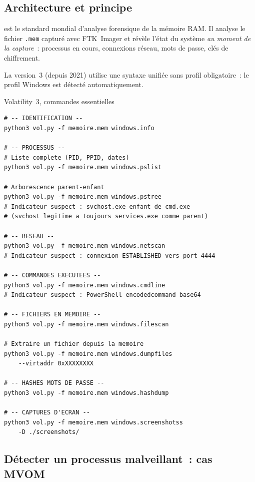\subsection{Architecture et principe}

 est le standard mondial d'analyse
forensique de la mémoire RAM. Il analyse le fichier \texttt{.mem} capturé
avec FTK~Imager et révèle l'état du système \emph{au moment de la capture}~:
processus en cours, connexions réseau, mots de passe, clés de chiffrement.

La version~3 (depuis 2021) utilise une syntaxe unifiée sans profil
obligatoire~: le profil Windows est détecté automatiquement.

\begin{boxoutils}{Volatility~3, commandes essentielles}
\begin{lstlisting}[language=bash_forensique]
# -- IDENTIFICATION --
python3 vol.py -f memoire.mem windows.info

# -- PROCESSUS --
# Liste complete (PID, PPID, dates)
python3 vol.py -f memoire.mem windows.pslist

# Arborescence parent-enfant
python3 vol.py -f memoire.mem windows.pstree
# Indicateur suspect : svchost.exe enfant de cmd.exe
# (svchost legitime a toujours services.exe comme parent)

# -- RESEAU --
python3 vol.py -f memoire.mem windows.netscan
# Indicateur suspect : connexion ESTABLISHED vers port 4444

# -- COMMANDES EXECUTEES --
python3 vol.py -f memoire.mem windows.cmdline
# Indicateur suspect : PowerShell encodedcommand base64

# -- FICHIERS EN MEMOIRE --
python3 vol.py -f memoire.mem windows.filescan

# Extraire un fichier depuis la memoire
python3 vol.py -f memoire.mem windows.dumpfiles
    --virtaddr 0xXXXXXXXX

# -- HASHES MOTS DE PASSE --
python3 vol.py -f memoire.mem windows.hashdump

# -- CAPTURES D'ECRAN --
python3 vol.py -f memoire.mem windows.screenshotss
    -D ./screenshots/
\end{lstlisting}
\end{boxoutils}

\subsection{Détecter un processus malveillant~: cas MVOM}

